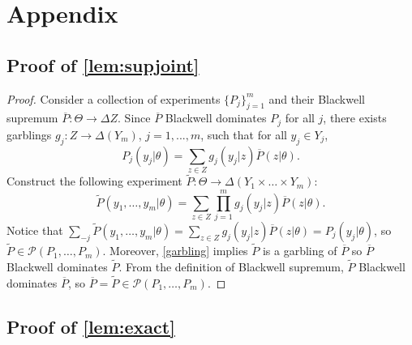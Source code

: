 \documentclass[11pt]{article}
\theoremstyle{plain}
\theoremstyle{remark}
\begin{document}
    





	


	

	
\newpage
\appendix
\section{Appendix}
	
	
\subsection{Proof of \autoref{lem:supjoint}}\label{proof:blackwellsup}
\begin{proof}
Consider a collection of experiments $\{P_j\}_{j=1}^m$ and their Blackwell supremum $\overline{P}:\Theta\rightarrow \Delta Z$. Since $\overline{P}$ Blackwell dominates $P_j$ for all $j$, there exists garblings $g_j: Z\rightarrow\Delta (Y_m)$, $j=1,...,m$, such that for all $y_j\in Y_j$,
$$P_j(y_j|\theta)=\sum_{z\in Z}g_j(y_j|z)\overline{P}(z|\theta).$$
Construct the following experiment $\tilde{P}:\Theta\rightarrow\Delta(Y_1\times\ldots\times Y_m)$:
\begin{equation}\label{garbling}
\tilde{P}(y_1,\ldots,y_m|\theta)=\sum_{z\in Z}\prod_{j=1}^mg_j(y_j|z)\overline{P}(z|\theta).
\end{equation}
Notice that $\sum_{-j}\tilde{P}(y_1,\ldots,y_m|\theta)=\sum_{z\in Z}g_j(y_j|z)\overline{P}(z|\theta)=P_j(y_j|\theta)$, so $\tilde{P}\in \mathcal{P}(P_1, \ldots , P_m)$. Moreover, \eqref{garbling} implies $\tilde{P}$ is a garbling of $\overline{P}$ so $\overline{P}$ Blackwell dominates $\tilde{P}$. From the definition of Blackwell supremum, $\tilde{P}$ Blackwell dominates $\overline{P}$, so $\overline{P}=\tilde{P}\in \mathcal{P}(P_1, \ldots , P_m)$.
\end{proof}

\subsection{Proof of \autoref{lem:exact}}\label{proof:interior}
\end{document}
